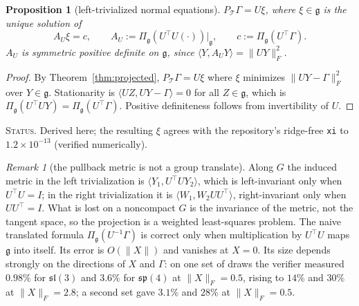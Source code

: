 \documentclass[11pt]{article}
\newtheorem{proposition}[theorem]{Proposition}
\theoremstyle{definition}
\theoremstyle{remark}
\newtheorem{remark}[theorem]{Remark}
\newcommand{\g}{\mathfrak{g}}
\newcommand{\ip}[2]{\langle #1, #2\rangle}
\newcommand{\status}[1]{\par\smallskip\noindent\textsc{Status.} #1\par\smallskip}
\begin{document}
\begin{proposition}[left-trivialized normal equations]\label{prop:normal}
$P_\mathcal{T}\Gamma=U\xi$, where $\xi\in\g$ is the unique solution of
\begin{equation}\label{eq:normal}
A_U\xi=c,\qquad A_U:=\Pi_\g(U^\top U(\cdot))|_\g,\qquad c:=\Pi_\g(U^\top\Gamma).
\end{equation}
$A_U$ is symmetric positive definite on $\g$, since $\ip{Y}{A_UY}=\|UY\|_F^2$.
\end{proposition}
\begin{proof}
By Theorem~\ref{thm:projected}, $P_\mathcal{T}\Gamma=U\xi$ where $\xi$ minimizes $\|UY-\Gamma\|_F^2$ over $Y\in\g$. Stationarity is $\ip{UZ}{UY-\Gamma}=0$ for all $Z\in\g$, which is $\Pi_\g(U^\top UY)=\Pi_\g(U^\top\Gamma)$. Positive definiteness follows from invertibility of $U$.
\end{proof}
\status{Derived here; the resulting $\xi$ agrees with the repository's ridge-free \texttt{xi} to $1.2\times10^{-13}$ (verified numerically).}

\begin{remark}[the pullback metric is not a group translate]\label{rem:translate}
Along $G$ the induced metric in the left trivialization is $\ip{Y_1}{U^\top UY_2}$, which is left-invariant only when $U^\top U=I$; in the right trivialization it is $\ip{W_1}{W_2UU^\top}$, right-invariant only when $UU^\top=I$. What is lost on a noncompact $G$ is the invariance of the metric, not the tangent space, so the projection is a weighted least-squares problem. The naive translated formula $\Pi_\g(U^{-1}\Gamma)$ is correct only when multiplication by $U^\top U$ maps $\g$ into itself. Its error is $O(\|X\|)$ and vanishes at $X=0$. Its size depends strongly on the directions of $X$ and $\Gamma$: on one set of draws the verifier measured $0.98\%$ for $\mathfrak{sl}(3)$ and $3.6\%$ for $\mathfrak{sp}(4)$ at $\|X\|_F=0.5$, rising to $14\%$ and $30\%$ at $\|X\|_F=2.8$; a second set gave $3.1\%$ and $28\%$ at $\|X\|_F=0.5$.
\end{remark}
\end{document}
